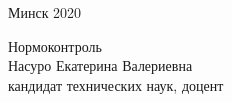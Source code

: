 \begin{titlepage}
    \vfill
    \begin{center}
        Минск 2020
    \end{center}

    \clearpage

    \vspace*{37em}
    \begin{raggedleft}
        \begin{minipage}{8cm}
            Нормоконтроль \\[1em]
            Насуро Екатерина Валериевна\\[1em]
            кандидат технических наук, доцент \\[1em]
            \null\hrulefill{} \\[1em]
        \end{minipage}
    \end{raggedleft}
\end{titlepage}
